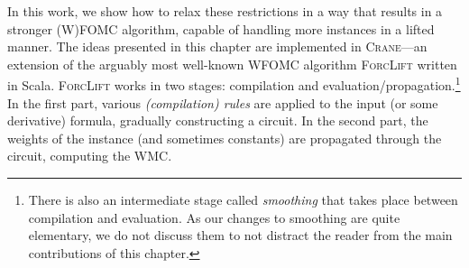 


In this work, we show how to relax these restrictions in a way that results in a
stronger (W)FOMC algorithm, capable of handling more instances in a lifted
manner. The ideas presented in this chapter are implemented in
\textsc{Crane}---an extension of the arguably most well-known WFOMC algorithm
\textsc{ForcLift} written in Scala. \textsc{ForcLift} works in two stages:
compilation and evaluation/propagation.\footnote{There is also an intermediate
  stage called \emph{smoothing} that takes place between compilation and
  evaluation. As our changes to smoothing are quite elementary, we do not
  discuss them to not distract the reader from the main contributions of this
  chapter.} In the first part, various \emph{(compilation) rules} are applied to
the input (or some derivative) formula, gradually constructing a circuit. In the
second part, the weights of the instance (and sometimes constants) are
propagated through the circuit, computing the WMC\@.

